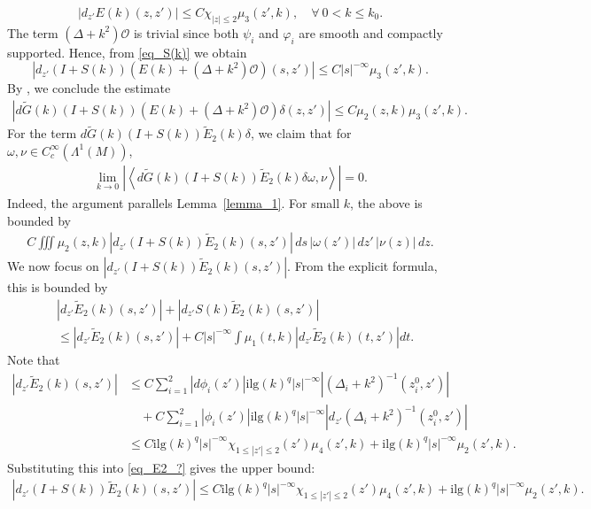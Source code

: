 \documentclass[12pt]{amsart}
\begin{document}
\[
|d_{z'} E(k)(z,z')| \le C \chi_{|z| \le 2} \mu_3(z',k), \quad \forall\ 0 < k \le k_0.
\]
The term \( (\Delta + k^2)\mathcal{O} \) is trivial since both \( \psi_i \) and \( \varphi_i \) are smooth and compactly supported. Hence, from \eqref{eq_S(k)} we obtain
\[
|d_{z'}(I + S(k)) \left(E(k) + (\Delta + k^2)\mathcal{O}\right)(s,z')| \le C |s|^{-\infty} \mu_3(z',k).
\]
By \cite[Proposition~3.6]{HNS}, we conclude the estimate
\begin{align}\label{eq_G4_1}
    \left|d\tilde{G}(k)(I + S(k)) \left(E(k) + (\Delta + k^2)\mathcal{O}\right)\delta(z,z') \right| \le C \mu_2(z,k) \mu_3(z',k).
\end{align}
For the term \( d\tilde{G}(k)(I + S(k)) \tilde{E}_2(k)\delta \), we claim that for \( \omega, \nu \in C_c^\infty(\Lambda^1(M)) \),
\begin{align}\label{claim}
    \lim_{k \to 0} \left| \left\langle d\tilde{G}(k)(I + S(k)) \tilde{E}_2(k)\delta\omega, \nu \right\rangle \right| = 0.
\end{align}
Indeed, the argument parallels Lemma~\ref{lemma_1}. For small \( k \), the above is bounded by
\begin{align}\label{eq_bili}
    C \iiint \mu_2(z,k) \left| d_{z'}(I + S(k)) \tilde{E}_2(k)(s,z') \right|\, ds\, |\omega(z')|\, dz'\, |\nu(z)|\, dz.
\end{align}
We now focus on \( \left|d_{z'}(I + S(k)) \tilde{E}_2(k)(s,z')\right| \). From the explicit formula, this is bounded by
\begin{align}\label{eq_E2_?}
    &\left|d_{z'} \tilde{E}_2(k)(s,z')\right| + \left|d_{z'} S(k)\tilde{E}_2(k)(s,z')\right| \\ \nonumber
    &\le \left|d_{z'} \tilde{E}_2(k)(s,z')\right| + C |s|^{-\infty} \int \mu_1(t,k) \left|d_{z'} \tilde{E}_2(k)(t,z')\right| dt.
\end{align}
Note that
\begin{align*}
    \left|d_{z'} \tilde{E}_2(k)(s,z')\right| &\le C \sum_{i=1}^2 |d\phi_i(z')| \mathrm{ilg}(k)^q |s|^{-\infty} |(\Delta_i + k^2)^{-1}(z_i^0,z')| \\
    &\quad + C \sum_{i=1}^2 |\phi_i(z')| \mathrm{ilg}(k)^q |s|^{-\infty} |d_{z'}(\Delta_i + k^2)^{-1}(z_i^0,z')| \\
    &\le C \mathrm{ilg}(k)^q |s|^{-\infty} \chi_{1 \le |z'| \le 2}(z') \mu_4(z',k) + \mathrm{ilg}(k)^q |s|^{-\infty} \mu_2(z',k).
\end{align*}
Substituting this into \eqref{eq_E2_?} gives the upper bound:
\begin{align}\label{eq_G4_L1}
    \left|d_{z'}(I + S(k)) \tilde{E}_2(k)(s,z')\right| \le C \mathrm{ilg}(k)^q |s|^{-\infty} \chi_{1 \le |z'| \le 2}(z') \mu_4(z',k) + \mathrm{ilg}(k)^q |s|^{-\infty} \mu_2(z',k).
\end{align}
\end{document}
